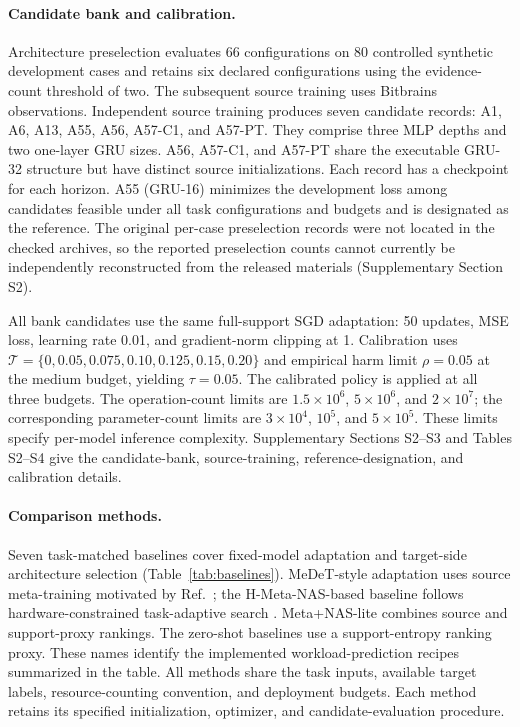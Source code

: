\documentclass[a4paper,fleqn]{cas-sc}
\begin{document}


\paragraph{Candidate bank and calibration.}
Architecture preselection evaluates 66 configurations on 80 controlled
synthetic development cases and retains six declared configurations using
the evidence-count threshold of two. The subsequent source training uses
Bitbrains observations. Independent source training
produces seven candidate records: A1, A6, A13, A55, A56, A57-C1, and A57-PT.
They comprise three MLP depths and two one-layer GRU sizes. A56, A57-C1,
and A57-PT share the executable GRU-32 structure but have distinct source
initializations. Each record has a checkpoint for each horizon. A55
(GRU-16) minimizes the development loss among candidates feasible under all
task configurations and budgets and is designated as the reference.
The original per-case preselection records were not located in the checked
archives, so the reported preselection counts cannot currently be independently
reconstructed from the released materials (Supplementary Section S2).

All bank candidates use the same full-support SGD adaptation: 50 updates,
MSE loss, learning rate 0.01, and gradient-norm clipping at 1. Calibration
uses $\mathcal T=\{0,0.05,0.075,0.10,0.125,0.15,0.20\}$ and empirical
harm limit $\rho=0.05$ at the medium budget, yielding $\tau=0.05$.
The calibrated policy is applied at all three budgets. The operation-count
limits are $1.5\times10^6$, $5\times10^6$, and $2\times10^7$; the
corresponding parameter-count limits are $3\times10^4$, $10^5$, and
$5\times10^5$. These limits specify per-model inference complexity.
Supplementary Sections S2--S3 and Tables S2--S4 give the candidate-bank,
source-training, reference-designation, and calibration details.

\paragraph{Comparison methods.}
Seven task-matched baselines cover fixed-model adaptation and target-side
architecture selection (Table~\ref{tab:baselines}). MeDeT-style adaptation
uses source meta-training motivated by Ref.~\cite{ref11}; the
H-Meta-NAS-based baseline follows hardware-constrained task-adaptive search
\cite{ref30}. Meta+NAS-lite combines source and support-proxy rankings.
The zero-shot baselines use a support-entropy ranking proxy. These names
identify the implemented workload-prediction recipes summarized in the table.
All methods share the task inputs, available target labels, resource-counting
convention, and deployment budgets. Each method retains its specified
initialization, optimizer, and candidate-evaluation procedure.
\end{document}
